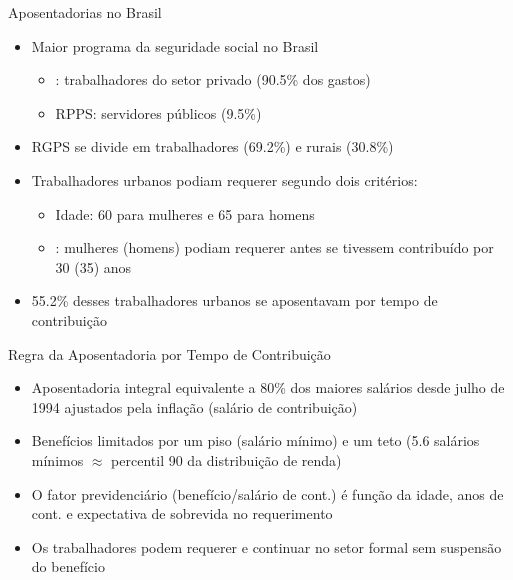 \begin{frame}{Aposentadorias no Brasil}
    \begin{itemize}
        \item Maior programa da seguridade social no Brasil
        \begin{itemize}
            \item {}: trabalhadores do setor privado (90.5\% dos gastos)
            \item RPPS: servidores públicos (9.5\%)
        \end{itemize}
        \item  RGPS se divide em trabalhadores  (69.2\%) e rurais (30.8\%)
        \item Trabalhadores urbanos podiam requerer segundo dois critérios:
        \begin{itemize}
            \item Idade: 60 para mulheres e 65 para homens
            \item {}: mulheres (homens) podiam requerer antes se tivessem contribuído por 30 (35) anos
        \end{itemize}
        \item 55.2\% desses trabalhadores urbanos se aposentavam por tempo de contribuição
    \end{itemize}
\end{frame}

\begin{frame}{Regra da Aposentadoria por Tempo de Contribuição}
    \begin{itemize}
        \item Aposentadoria integral equivalente a 80\% dos maiores salários desde julho de 1994 ajustados pela inflação (salário de contribuição)
        \item Benefícios limitados por um piso (salário mínimo) e um teto (5.6 salários mínimos $\approx$ percentil 90 da distribuição de renda)
        \item O fator previdenciário (benefício/salário de cont.) é função da idade, anos de cont. e expectativa de sobrevida no requerimento
        \item Os trabalhadores podem requerer e continuar no setor formal sem suspensão do benefício
    \end{itemize}
\end{frame}

